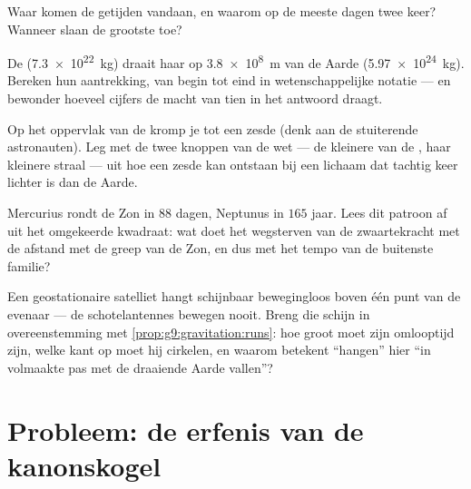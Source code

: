 \begin{exercise}[$\star$]\label{exo:g9:gravitation:8}
Waar komen de getijden vandaan, en waarom op de meeste dagen twee keer?
Wanneer slaan de grootste toe?
\end{exercise}

\begin{exercise}[$\star\star$]\label{exo:g9:gravitation:9}
De  (\qty{7.3e22}{kg}) draait haar  op
\qty{3.8e8}{m} van de Aarde (\qty{5.97e24}{kg}). Bereken hun
aantrekking, van begin tot eind in wetenschappelijke notatie --- en
bewonder hoeveel cijfers de macht van tien in het antwoord draagt.
\end{exercise}

\begin{exercise}[$\star\star$]\label{exo:g9:gravitation:10}
Op het oppervlak van de  kromp je 
tot een zesde (denk aan de stuiterende astronauten). Leg met de twee
knoppen van de wet --- de kleinere  van de
, haar kleinere straal --- uit hoe een zesde kan ontstaan
bij een lichaam dat tachtig keer lichter is dan de Aarde.
\end{exercise}

\begin{exercise}[$\star\star$]\label{exo:g9:gravitation:11}
Mercurius rondt de Zon in $88$ dagen, Neptunus in $165$ jaar. Lees dit
patroon af uit het omgekeerde kwadraat: wat doet het wegsterven van de
zwaartekracht met de afstand met de greep van de Zon, en dus met het
tempo van de buitenste familie?
\end{exercise}

\begin{exercise}[$\star\star\star$]\label{exo:g9:gravitation:12}
Een geostationaire satelliet hangt schijnbaar bewegingloos boven één
punt van de evenaar --- de schotelantennes bewegen nooit. Breng die
schijn in overeenstemming met \cref{prop:g9:gravitation:runs}: hoe groot
moet zijn omlooptijd zijn, welke kant op moet hij cirkelen, en waarom
betekent ``hangen'' hier ``in volmaakte pas met de draaiende Aarde
vallen''?
\end{exercise}

\section{Probleem: de erfenis van de kanonskogel}


